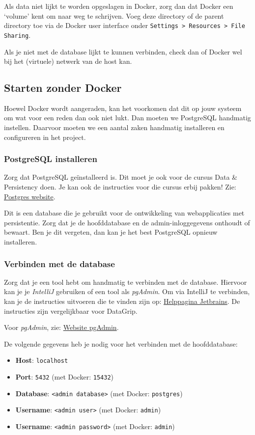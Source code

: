 Als data niet lijkt te worden opgeslagen in Docker, zorg dan dat Docker een `volume' kent om 
naar weg te schrijven. Voeg deze directory of de parent directory toe via de Docker user interface 
onder \texttt{Settings > Resources > File Sharing}.

Als je niet met de database lijkt te kunnen verbinden, check dan of Docker 
wel bij het (virtuele) netwerk van de host kan.

\subsection{Starten zonder Docker}
Hoewel Docker wordt aangeraden, kan het voorkomen dat dit op jouw systeem 
om wat voor een reden dan ook niet lukt. Dan moeten we PostgreSQL handmatig instellen.
Daarvoor moeten we een aantal zaken handmatig installeren en configureren in het project.

\subsubsection{PostgreSQL installeren}
Zorg dat PostgreSQL geïnstalleerd is. Dit moet je ook voor de cursus Data & Persistency doen.
Je kan ook de instructies voor die cursus erbij pakken!
Zie: \href{https://www.postgresql.org/download/}{Postgres website}.

Dit is een database die je gebruikt voor de ontwikkeling van webapplicaties met persistentie.
Zorg dat je de hoofddatabase en de admin-inloggegevens onthoudt of bewaart.
Ben je dit vergeten, dan kan je het best PostgreSQL opnieuw installeren.

\subsubsection{Verbinden met de database}
Zorg dat je een tool hebt om handmatig te verbinden met de database.
Hiervoor kan je je \textit{IntelliJ} gebruiken of een tool als \textit{pgAdmin}.
Om via IntelliJ te verbinden, kan je de instructies uitvoeren die te vinden zijn op:
\href{https://www.jetbrains.com/help/idea/connecting-to-a-database.html#connect-to-postgresql-database}{Helppagina Jetbrains}.
De instructies zijn vergelijkbaar voor DataGrip.

Voor \textit{pgAdmin}, zie: \href{https://www.pgadmin.org/}{Website pgAdmin}.

De volgende gegevens heb je nodig voor het verbinden met de hoofddatabase:
\begin{itemize}
    \item \textbf{Host}: \texttt{localhost}
    \item \textbf{Port}: \texttt{5432} (met Docker: \texttt{15432})
    \item \textbf{Database}: \texttt{<admin database>} (met Docker: \texttt{postgres})
    \item \textbf{Username}: \texttt{<admin user>} (met Docker: \texttt{admin})
    \item \textbf{Username}: \texttt{<admin password>} (met Docker: \texttt{admin})
\end{itemize}

